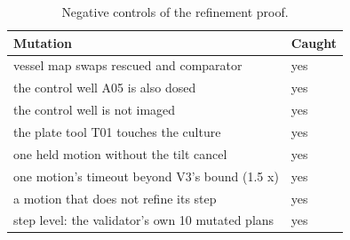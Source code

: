 \documentclass[10pt,a4paper]{article}
\begin{document}
\begin{table}[tbp]\centering\small
\caption{Negative controls of the refinement proof.}\label{tab:negative}
\begin{tabularx}{\linewidth}{Xl}\toprule
\textbf{Mutation} & \textbf{Caught} \\\midrule
vessel map swaps rescued and comparator & yes \\
the control well A05 is also dosed & yes \\
the control well is not imaged & yes \\
the plate tool T01 touches the culture & yes \\
one held motion without the tilt cancel & yes \\
one motion's timeout beyond V3's bound (1.5 x) & yes \\
a motion that does not refine its step & yes \\
step level: the validator's own 10 mutated plans & yes \\\bottomrule
\end{tabularx}
\end{table}
\end{document}

